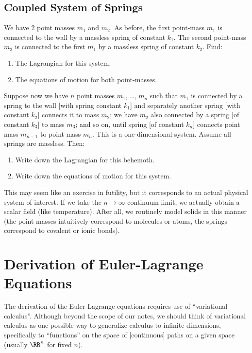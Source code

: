 \subsection{Coupled System of Springs}

We have 2 point masses $m_{1}$ and $m_{2}$. As before, the first
point-mass $m_{1}$ is connected to the wall by a massless spring of
constant $k_{1}$. The second point-mass $m_{2}$ is connected to the
first $m_{1}$ by a massless spring of constant $k_{2}$. Find:
\begin{enumerate}
\item The Lagrangian for this system.
\item The equations of motion for both point-masses.
\end{enumerate}

\begin{exercise}
Suppose now we have $n$ point masses $m_{1}$, \dots, $m_{n}$ such that
$m_{1}$ is connected by a spring to the wall [with spring constant
$k_{1}$] and separately another spring [with constant $k_{2}$] connects
it to mass $m_{2}$; we have $m_{2}$ also connected by a spring [of
constant $k_{3}$] to mass $m_{3}$; and so on, until spring [of constant $k_{n}$]
connects point mass $m_{n-1}$ to point mass $m_{n}$. This is a
one-dimensional system. Assume all springs are massless. Then:
\begin{enumerate}
\item Write down the Lagrangian for this behemoth.
\item Write down the equations of motion for this system.
\end{enumerate}
\end{exercise}

\begin{remark}
This may seem like an exercise in futility, but it corresponds to an
actual physical system of interest. If we take the $n\to\infty$
continuum limit, we actually obtain a scalar field (like temperature).
After all, we routinely model solids in this manner (the point-masses
intuitively correspond to molecules or atoms, the springs correspond to
covalent or ionic bonds).
\end{remark}

\section{Derivation of Euler-Lagrange Equations}

\M
The derivation of the Euler-Lagrange equations requires use of
``variational calculus''. Although beyond the scope of our notes, we
should think of variational calculus as one possible way to generalize
calculus to infinite dimensions, specifically to ``functions'' on the
space of [continuous] paths on a given space (usually $\RR^{n}$ for
fixed $n$).

